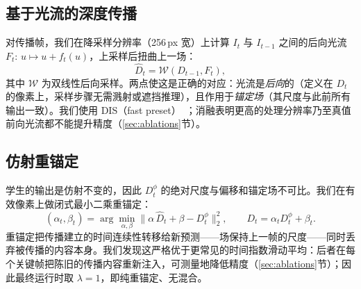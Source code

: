 \documentclass[10pt,twocolumn]{article}
\begin{document}
\subsection{基于光流的深度传播}
对传播帧，我们在降采样分辨率（256\,px 宽）上计算 $I_t$ 与 $I_{t-1}$ 之间的后向光流 $F_t:\, u \mapsto u + f_t(u)$，上采样后扭曲上一场：
\begin{equation}
  \hat{D}_t = \mathcal{W}(D_{t-1}, F_t),
  \label{eq:warp}
\end{equation}
其中 $\mathcal{W}$ 为双线性后向采样。两点使这是正确的对应：光流是\emph{后向}的（定义在 $D_t$ 的像素上，采样步骤无需溅射或遮挡推理），且作用于\emph{锚定场}（其尺度与此前所有输出一致）。我们使用 DIS（fast preset）~\cite{disflow}；消融表明更高的处理分辨率乃至真值前向光流都不能提升精度（\ref{sec:ablations}节）。

\subsection{仿射重锚定}
学生的输出是仿射不变的，因此 $D^{\phi}_t$ 的绝对尺度与偏移和锚定场不可比。我们在有效像素上做闭式最小二乘重锚定：
\begin{equation}
  (\alpha_t, \beta_t) = \arg\min_{\alpha,\beta}
    \big\lVert \alpha\, \hat{D}_t + \beta - D^{\phi}_t \big\rVert^2_2,
  \qquad
  D_t = \alpha_t D^{\phi}_t + \beta_t .
  \label{eq:reanchor}
\end{equation}
重锚定把传播建立的时间连续性转移给新预测——场保持上一帧的尺度——同时丢弃被传播的内容本身。我们发现这严格优于更常见的时间指数滑动平均：后者在每个关键帧把陈旧的传播内容重新注入，可测量地降低精度（\ref{sec:ablations}节）；因此最终运行时取 $\lambda=1$，即纯重锚定、无混合。
\end{document}

